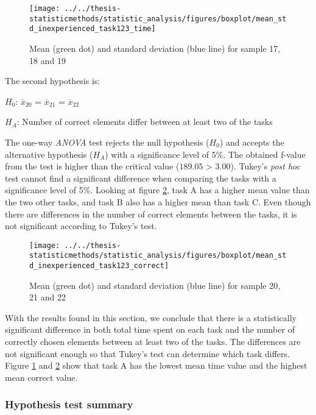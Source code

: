 \begin{figure}[H]
	\centering
	\texttt{[image: ../../thesis-statisticmethods/statistic\_analysis/figures/boxplot/mean\_std\_inexperienced\_task123\_time]}
	\caption{Mean (green dot) and standard deviation (blue line) for sample 17, 18 and 19}
	\label{fig:meanstdinexperiencedtask123time}
\end{figure}

The second hypothesis is:\\
\centerline{$H_{0}$: $\overline{x}_{20}$ = $\overline{x}_{21}$ = $\overline{x}_{22}$}
\centerline{$H_{A}$: Number of correct elements differ between at least two of the tasks}
\vspace{0.2cm}

The one-way \textit{ANOVA} test rejects the null hypothesis ($H_0$) and accepts the alternative hypothesis ($H_{A}$) with a significance level of 5\%. The obtained f-value from the test is higher than the critical value ($189.05$ > $3.00$). Tukey's \textit{post hoc} test cannot find a significant difference when comparing the tasks with a significance level of 5\%. Looking at figure \ref{fig:meanstdinexperiencedtask123correct}, task A has a higher mean value than the two other tasks, and task B also has a higher mean than task C. Even though there are differences in the number of correct elements between the tasks, it is not significant according to Tukey's test. 

\begin{figure}[H]
	\centering
	\texttt{[image: ../../thesis-statisticmethods/statistic\_analysis/figures/boxplot/mean\_std\_inexperienced\_task123\_correct]}
	\caption{Mean (green dot) and standard deviation (blue line) for sample 20, 21 and 22}
	\label{fig:meanstdinexperiencedtask123correct}
\end{figure}

With the results found in this section, we conclude that there is a statistically significant difference in both total time spent on each task and the number of correctly chosen elements between at least two of the tasks. The differences are not significant enough so that Tukey's test can determine which task differs. Figure \ref{fig:meanstdinexperiencedtask123time} and \ref{fig:meanstdinexperiencedtask123correct} show that task A has the lowest mean time value and the highest mean correct value. 

\newpage

\subsubsection{Hypothesis test summary}

